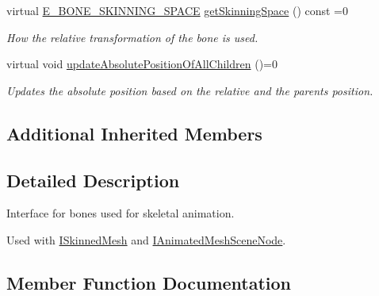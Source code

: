 \begin{DoxyCompactItemize}
\mbox{\label{classirr_1_1scene_1_1IBoneSceneNode_aa41c118c8fa8741c6945787c50c42df7}} 
virtual \hyperlink{namespaceirr_1_1scene_a47bfc785c34c953f926c920cd13ba1fb}{E\+\_\+\+B\+O\+N\+E\+\_\+\+S\+K\+I\+N\+N\+I\+N\+G\+\_\+\+S\+P\+A\+CE} \hyperlink{classirr_1_1scene_1_1IBoneSceneNode_aa41c118c8fa8741c6945787c50c42df7}{get\+Skinning\+Space} () const =0
\begin{DoxyCompactList}\small\item\em How the relative transformation of the bone is used. \end{DoxyCompactList}\item 
\mbox{\label{classirr_1_1scene_1_1IBoneSceneNode_ab405c67e87dd79b7c1b9c16a6b8c3182}} 
virtual void \hyperlink{classirr_1_1scene_1_1IBoneSceneNode_ab405c67e87dd79b7c1b9c16a6b8c3182}{update\+Absolute\+Position\+Of\+All\+Children} ()=0
\begin{DoxyCompactList}\small\item\em Updates the absolute position based on the relative and the parents position. \end{DoxyCompactList}\end{DoxyCompactItemize}
\subsection*{Additional Inherited Members}


\subsection{Detailed Description}
Interface for bones used for skeletal animation. 

Used with \hyperlink{classirr_1_1scene_1_1ISkinnedMesh}{I\+Skinned\+Mesh} and \hyperlink{classirr_1_1scene_1_1IAnimatedMeshSceneNode}{I\+Animated\+Mesh\+Scene\+Node}. 

\subsection{Member Function Documentation}
\mbox{\label{classirr_1_1scene_1_1IBoneSceneNode_a1c40bee44b89fe81178782e999cbe3a8}} 
